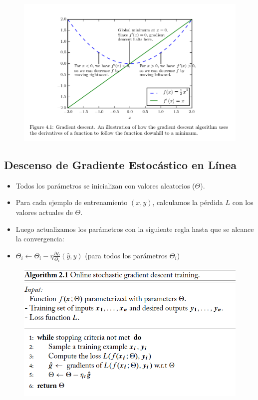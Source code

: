 \begin{figure}[htb]
	\centering
	 \includegraphics[scale=0.45]{pics/gradientdescent.png}
\end{figure}

\subsection{Descenso de Gradiente Estocástico en Línea}
\begin{itemize}
\item Todos los parámetros se inicializan con valores aleatorios ($\Theta$).
\item Para cada ejemplo de entrenamiento $(x,y)$, calculamos la pérdida $L$ con los valores actuales de $\Theta$.
\item Luego actualizamos los parámetros con la siguiente regla hasta que se alcance la convergencia:
\item $\Theta_i \leftarrow \Theta_i - \eta \frac{\partial L}{\Theta_i}(\hat{y},y)$ (para todos los parámetros $\Theta_i$)
\end{itemize}

\begin{figure}[htb]
	\centering
	 \includegraphics[scale=0.3]{pics/Online-SGD.png}
\end{figure}

